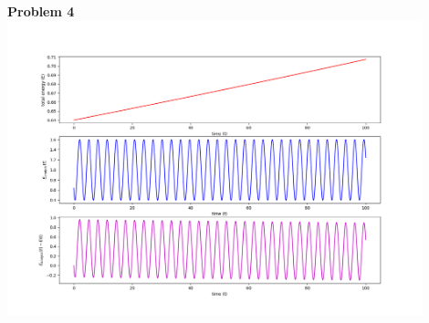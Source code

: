 \documentclass[12pt]{article}
\begin{document}
	\indent\textbf{Problem 4}\\
		\includegraphics[width=0.9\textwidth]{energyPlot.png}
		
\end{document}
